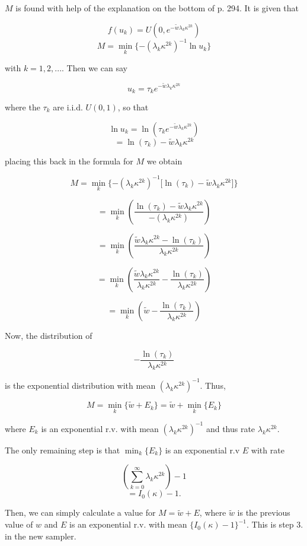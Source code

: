 \documentclass[12pt,a4paper]{article}
\begin{document}
$M$ is found with help of the explanation on the bottom of p. 294. It is given that

$$ f(u_k) = U(0, e^{-\tilde{w}\lambda_k\kappa^{2k}})$$
$$ M = \min_k \{-(\lambda_k \kappa ^{2k})^{-1} \ln u_k\}$$ 

with $k = 1, 2, ...$. Then we can say

$$ u_k = \tau_k e^{-\tilde{w}\lambda_k\kappa^{2k}} $$

where the $\tau_k$ are i.i.d. $U(0, 1)$, so that 

$$ \ln u_k = \ln (\tau_k e^{-\tilde{w}\lambda_k\kappa^{2k}})  $$ 
$$ = \ln(\tau_k) -\tilde{w}\lambda_k\kappa^{2k} $$

placing this back in the formula for $M$ we obtain

$$ M = \min_k \{-(\lambda_k \kappa ^{2k})^{-1} \lbrack \ln(\tau_k) -\tilde{w}\lambda_k\kappa^{2k} \rbrack \}$$ 

$$  = \min_k \left( \frac{\ln(\tau_k) -\tilde{w}\lambda_k\kappa^{2k}}{-(\lambda_k \kappa ^{2k})} \right) $$

$$  = \min_k \left( \frac{ \tilde{w}\lambda_k\kappa^{2k} - \ln(\tau_k)}{\lambda_k \kappa ^{2k}} \right) $$

$$  = \min_k \left( \frac{ \tilde{w}\lambda_k\kappa^{2k}}{\lambda_k \kappa ^{2k}} - \frac{ \ln(\tau_k)}{\lambda_k \kappa ^{2k}}  \right) $$

$$  = \min_k \left( \tilde{w} - \frac{ \ln(\tau_k)}{\lambda_k \kappa ^{2k}}  \right) $$

Now, the distribution of 

$$ - \frac{ \ln(\tau_k)}{\lambda_k \kappa ^{2k}} $$ 

is the exponential distribution with mean $(\lambda_k \kappa ^{2k})^{-1} $. Thus,
 
$$ M = \min_k \{ \tilde{w} + E_k \} =  \tilde{w} + \min_k \{ E_k \}$$ 

where $E_k$ is an exponential r.v. with mean $(\lambda_k \kappa ^{2k})^{-1}$ and thus rate $\lambda_k \kappa ^{2k}$.

The only remaining step is that $\min_k \{E_k\}$ is an exponential r.v $E$ with rate 

$$ \left(\sum_{k=0}^{\infty} \lambda_k \kappa ^{2k} \right) - 1 $$
$$ = I_0(\kappa) - 1.$$

Then, we can simply calculate a value for $M = \tilde{w} + E$, where $\tilde{w}$ is the previous value of $w$ and $E$ is an exponential r.v. with mean $\{ I_0(\kappa) - 1 \}^{-1}$. This is step 3. in the new sampler. 
\end{document}
